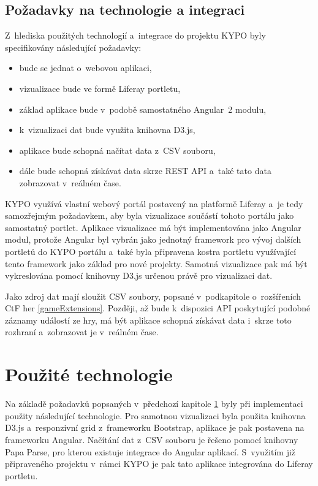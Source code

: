 \documentclass[
  digital, %
  oneside, %
  table,   %
  nolof,     %
  nolot,     %
]{fithesis3}
\begin{document}
\section{Požadavky na technologie a integraci} \label{technologyRequirements}
Z~hlediska použitých technologií a~integrace do projektu KYPO byly specifikovány následující požadavky:
\begin{itemize}
  \item bude se jednat o~webovou aplikaci,
  \item vizualizace bude ve formě Liferay portletu,
  \item základ aplikace bude v~podobě samostatného Angular~2 modulu,
  \item k~vizualizaci dat bude využita knihovna D3.js,
  \item aplikace bude schopná načítat data z~CSV souboru,
  \item dále bude schopná získávat data skrze REST API a~také tato data zobrazovat v~reálném čase.
\end{itemize}
KYPO využívá vlastní webový portál postavený na platformě Liferay a~je tedy samozřejmým požadavkem, aby byla vizualizace součástí tohoto portálu jako samostatný portlet. Aplikace vizualizace má být implementována jako Angular modul, protože Angular byl vybrán jako jednotný framework pro vývoj dalších portletů do KYPO portálu a~také byla připravena kostra portletu využívající tento framework jako základ pro nové projekty. Samotná vizualizace pak má být vykreslována pomocí knihovny D3.js určenou právě pro vizualizaci dat.\par
Jako zdroj dat mají sloužit CSV soubory, popsané v~podkapitole o~rozšířeních CtF her \ref{gameExtensions}. Později, až bude k~dispozici API poskytující podobné záznamy událostí ze hry, má být aplikace schopná získávat data i~skrze toto rozhraní a~zobrazovat je v~reálném čase.

\chapter{Použité technologie}
Na základě požadavků popsaných v~předchozí kapitole \ref{technologyRequirements} byly při implementaci použity následující technologie. Pro samotnou vizualizaci byla použita knihovna D3.js a~responzivní grid z~frameworku Bootstrap, aplikace je pak postavena na frameworku Angular. Načítání dat z~CSV souboru je řešeno pomocí knihovny Papa Parse, pro kterou existuje integrace do Angular aplikací. S~využitím již připraveného projektu v~rámci KYPO je pak tato aplikace integrována do Liferay portletu.
\end{document}
